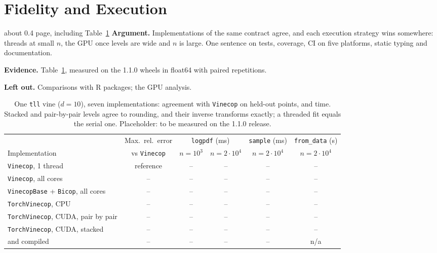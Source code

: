 \documentclass[twoside,11pt]{article}
\begin{document}
\section{Fidelity and Execution}

\begin{plan}{about 0.4 page, including Table~\ref{tab:fidelity}}
\textbf{Argument.} Implementations of the same contract agree, and each
execution strategy wins somewhere: threads at small $n$, the GPU once levels
are wide and $n$ is large. One sentence on tests, coverage, CI on five
platforms, static typing and documentation.

\textbf{Evidence.} Table~\ref{tab:fidelity}, measured on the 1.1.0 wheels in
float64 with paired repetitions.

\textbf{Left out.} Comparisons with R packages; the GPU analysis.
\end{plan}

\begin{table}[t]
\centering
\footnotesize
\setlength{\tabcolsep}{4pt}
\begin{tabular}{@{}lccccc@{}}
\toprule
 & Max.\ rel.\ error & \multicolumn{2}{c}{\texttt{logpdf} (ms)}
 & \texttt{sample} (ms) & \texttt{from\_data} (s) \\
\cmidrule(lr){3-4}
Implementation & vs \texttt{Vinecop} & $n = 10^3$ & $n = 2 \cdot 10^4$
 & $n = 2 \cdot 10^4$ & $n = 2 \cdot 10^4$ \\
\midrule
\texttt{Vinecop}, 1 thread & reference & -- & -- & -- & -- \\
\texttt{Vinecop}, all cores & -- & -- & -- & -- & -- \\
\texttt{VinecopBase} + \texttt{Bicop}, all cores & -- & -- & -- & -- & --
 \\
\texttt{TorchVinecop}, CPU & -- & -- & -- & -- & -- \\
\texttt{TorchVinecop}, CUDA, pair by pair & -- & -- & -- & -- & -- \\
\texttt{TorchVinecop}, CUDA, stacked & -- & -- & -- & -- & -- \\
\quad and compiled & -- & -- & -- & -- & n/a \\
\bottomrule
\end{tabular}
\caption{One \texttt{tll} vine ($d = 10$), seven implementations: agreement
with \texttt{Vinecop} on held-out points, and time. Stacked and pair-by-pair
levels agree to rounding, and their inverse transforms exactly; a threaded fit
equals the serial one. Placeholder: to be measured on the 1.1.0 release.}
\label{tab:fidelity}
\end{table}
\end{document}
